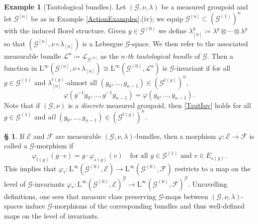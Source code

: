\documentclass[11pt, oneside]{amsart}
\theoremstyle{definition}
\newtheorem{example}[lemma]{Example}
\newtheorem{no}[lemma]{\S}
\theoremstyle{remark}
\theoremstyle{TheoremNum}
\newcommand\calG{{\mathcal G}}
\newcommand\cF{{\mathcal F}}
\newcommand{\cE}{\mathcal E}
\newcommand{\Linf}{\mathrm{L}^{\infty}}
\newcommand{\cG}{\mathcal{G}}
\renewcommand{\phi}{\varphi}
\newcommand{\cL}{\mathcal L}
\begin{document}
\begin{example}[Tautological bundles]\label{BEBF}
   Let $(\calG,\nu,\lambda)$ be a measured groupoid and let $\cG^{[n]}$ be as in Example \ref{ActionExamples}.(iv); we equip  $\mathcal{G}^{[n]} \subset (\cG^{(1)})^n$ with the induced Borel structure. Given $y \in \cG^{(0)}$ we define $\lambda_{[n]}^y\coloneqq \lambda^y\otimes\cdots\otimes \lambda^y$ so that $(\cG^{[n]}, \nu\circ \lambda_{[n]} )$ is a Lebesgue $\cG$-space. We then refer to the associated measurable bundle $\cL^n\coloneqq \mathcal{L}_{\mathcal{G}^{[n]}}$ as the \emph{$n$-th tautological bundle} of $\cG$. Then a function  in  $\Linf(\mathcal{G}^{[n]}, \nu\circ \lambda_{[n]}) \cong \Linf(\cG^{(0)}, \cL^n)$ is $\cG$-invariant if for all $g \in \cG^{(1)}$ and $\lambda^{t(g)}_{[n]}$-almost all $(g_0, \dots, g_{n-1}) \in (\cG^{t(g)})^n$,
\begin{equation}\label{TautInv}
\phi(g^{-1}g_0,\ldots,g^{-1}g_{n-1}) = \phi(g_0, \dots, g_{n-1}).
\end{equation}
Note that if $(\cG, \nu)$ is a \emph{discrete} measured groupoid, then \eqref{TautInv} holds for all $g \in \cG^{(1)}$ and \emph{all} $(g_0, \dots, g_{n-1}) \in (\cG^{t(g)})^n$.
\end{example}
\begin{no} If $\mathcal{E}$ and $\mathcal{F}$ are measurable $(\cG, \nu, \lambda)$-bundles, then a morphism $\varphi: \cE \to \cF$ is called a 
$\mathcal{G}$-morphism if 
\[\varphi_{t(g)}(g\cdot v)= g\cdot \varphi_{s(g)}(v) \quad \text{for all }g \in \cG^{(1)} \text{ and }v\in E_{s(g)}.\]
This implies that  $\phi_*: \Linf(\cG^{(0)},\mathcal{E}) \to \Linf(\cG^{(0)},\mathcal{F})$ restricts to a map on the level of $\cG$-invariants $\phi_*: \Linf(\cG^{(0)},\mathcal{E})^{\cG} \to \Linf(\cG^{(0)},\mathcal{F})^{\cG}$. Unravelling definitions, one sees that measure class preserving $\cG$-maps between $(\cG, \nu, \lambda)$-spaces induce $\cG$-morphisms of the corresponding bundles and thus well-defined maps on the level of invariants.
\end{no}
\end{document}
